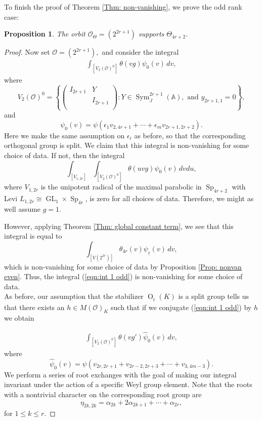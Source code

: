 \documentclass[11pt,reqno]{amsart}
\newtheorem{Prop}[Thm]{Proposition}
\theoremstyle{definition}
\theoremstyle{remark}
\theoremstyle{definition}
\begin{document}
To finish the proof of Theorem \ref{Thm: non-vanishing}, we prove the odd rank case:
\begin{Prop}
The orbit ${\mathcal{O}}_{\Theta}= (2^{2r+1})$ supports $\Theta_{4r+2}$.
\end{Prop}

\begin{proof}
Now set ${\mathcal{O}}=(2^{2r+1}),$ and consider the integral 
\begin{align}\label{eqn:int 1 odd}
\displaystyle\int_{[V_2({\mathcal{O}})^0]}\theta(vg)\psi_{0}(v)\,dv,
\end{align}
where 
\[
V_2({\mathcal{O}})^0= \left\{ \left( \begin{array}{cc}
									I_{2r+1}&Y\\
									&I_{2r+1}\\\end{array}\right): Y\in \operatorname{Sym}_J^{2r+1}({\mathbb A}), \mbox{ and } y_{2r+1,1} = 0\right\},
\]
and 
\[
\psi_{0}(v) =  \psi({\epsilon}_1 v_{2,4r+1} +\cdots + {\epsilon}_m v_{2r+1,2r+2}).
\]
Here we make the same assumption on ${\epsilon}_i$ as before, so that the corresponding orthogonal group is split. We claim that this integral is non-vanishing for some choice of data. If not, then the integral
\[
\displaystyle\int_{[V_{1,2r}]}\int_{[V_2({\mathcal{O}})^0]}\theta(uvg)\psi_{0}(v)\,dvdu,
\]
where $V_{1,2r}$ is the unipotent radical of the maximal parabolic in $\operatorname{Sp}_{4r+2}$ with Levi $L_{1,2r}\cong \operatorname{GL}_1\times\operatorname{Sp}_{4r}$, is zero for all choices of data. Therefore, we might as well assume $g=1$. 

However, applying Theorem \ref{Thm: global constant term}, we see that this integral is equal to 
\[
\int_{[V(2^{2r})]}\theta_{4r}(v)\psi_{\underline{\epsilon}}(v)\,dv,
\]
which is non-vanishing for some choice of data by Proposition \ref{Prop: nonvan even}. Thus, the integral (\ref{eqn:int 1 odd}) is non-vanishing for some choice of data.\\

As before, our assumption that the stabilizer $\operatorname{O}_{\underline{\epsilon}}(K)$ is a split group tells us that there exists an $h\in M({\mathcal{O}})_K$ such that if we conjugate (\ref{eqn:int 1 odd}) by $h$ we obtain

\begin{align}
\displaystyle\int_{[V_2({\mathcal{O}})^0]}\theta(vg')\hat{\psi}_{0}(v)\,dv,
\end{align}
where 
\[
\hat{\psi}_{0}(v)=\psi( v_{2r,2r+1} + v_{2r-2,2r+3}+\cdots + v_{3,4m-3}).
\]
We perform a series of root exchanges with the goal of making our integral invariant under the action of a specific Weyl group element. Note that the roots with a nontrivial character on the corresponding root group are 
\[
\eta_{2k,2k} = {\alpha}_{2k}+2{\alpha}_{2k+1}+\cdots+ {\alpha}_{2r},
\]
for $1\leq k\leq r$. 


\end{proof}
\end{document}
